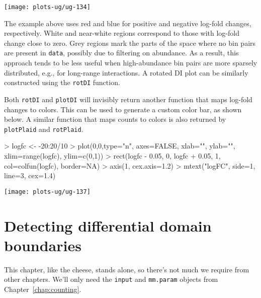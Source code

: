 \documentclass[12pt]{report}
\renewenvironment{Schunk}{\vspace{0pt}}{\vspace{0pt}}
\newcommand{\code}[1]{{\small\texttt{#1}}}
\newenvironment{combox}
{ \begin{shaded}\begin{center}\begin{minipage}[t]{0.95\textwidth} }
{ \end{minipage}\end{center}\end{shaded} }
\begin{document}
\begin{center}
\texttt{[image: plots-ug/ug-134]}
\end{center}


The example above uses red and blue for positive and negative log-fold changes, respectively.
White and near-white regions correspond to those with log-fold change close to zero.
Grey regions mark the parts of the space where no bin pairs are present in \code{data}, possibly due to filtering on abundance.
As a result, this approach tends to be less useful when high-abundance bin pairs are more sparsely distributed, e.g., for long-range interactions.
A rotated DI plot can be similarly constructed using the \code{rotDI} function.

Both \code{rotDI} and \code{plotDI} will invisibly return another function that maps log-fold changes to colors.
This can be used to generate a custom color bar, as shown below.
A similar function that maps counts to colors is also returned by \code{plotPlaid} and \code{rotPlaid}.

\begin{Schunk}
\begin{Sinput}
> logfc <- -20:20/10
> plot(0,0,type="n", axes=FALSE, xlab="", ylab="", xlim=range(logfc), ylim=c(0,1))
> rect(logfc - 0.05, 0, logfc + 0.05, 1, col=colfun(logfc), border=NA)
> axis(1, cex.axis=1.2)
> mtext("logFC", side=1, line=3, cex=1.4)
\end{Sinput}
\end{Schunk}

\begin{center}
\texttt{[image: plots-ug/ug-137]}
\end{center}


\chapter{Detecting differential domain boundaries}
\label{chap:domains}
\begin{combox}
This chapter, like the cheese, stands alone, so there's not much we require from other chapters.
We'll only need the \code{input} and \code{mm.param} objects from Chapter~\ref{chap:counting}.
\end{combox}
\end{document}

